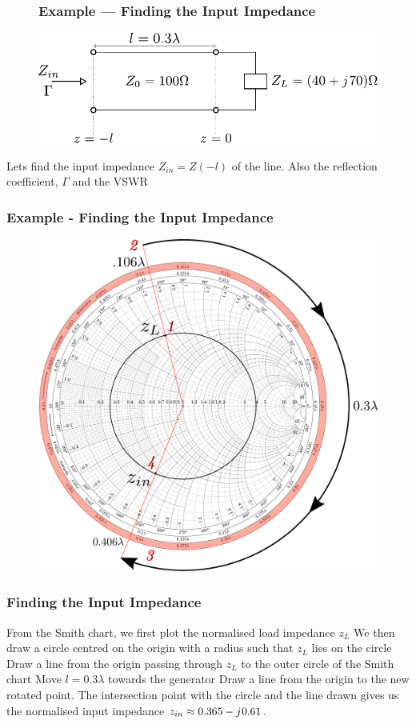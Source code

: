 \documentclass[10pt, compress]{beamer}
\renewcommand{\j}{{j}\mkern1mu} %
\begin{document}
\begin{frame}
    \begin{figure}[t!]
        \frametitle{Example — Finding the Input Impedance}
        \centering
        \includegraphics[width=.9\textwidth]{tline_terminated_example.pdf}
    \end{figure}
    \begin{outline}
        \1 Lets find the input impedance $Z_{in} = Z(-l)$ of the line.
        \1 Also the reflection coefficient, $\Gamma$ and the VSWR
    \end{outline}
\end{frame}

\begin{frame}
    \frametitle{Example - Finding the Input Impedance}
    \begin{figure}[T!]
        \centering
        \includegraphics[width=.70\textwidth]{smith example inkspace.pdf}
    \end{figure}

\end{frame}

\begin{frame}
    \frametitle{Finding the Input Impedance}
    \begin{outline}
        \1 From the Smith chart, we first plot the normalised load impedance $z_L$
        \1 We then draw a circle centred on the origin with a radius such that $z_L$ lies on the circle
        \1 Draw a line from the origin passing through $z_L$ to the outer circle of the Smith chart
        \1 Move $l = 0.3 \lambda$ towards the generator
        \1 Draw a line from the origin to the new rotated point.
        \1 The intersection point with the circle and the line drawn gives us the normalised input impedance $z_{in} \approx 0.365 - \j 0.61 $.
    \end{outline}
\end{frame}
\end{document}
